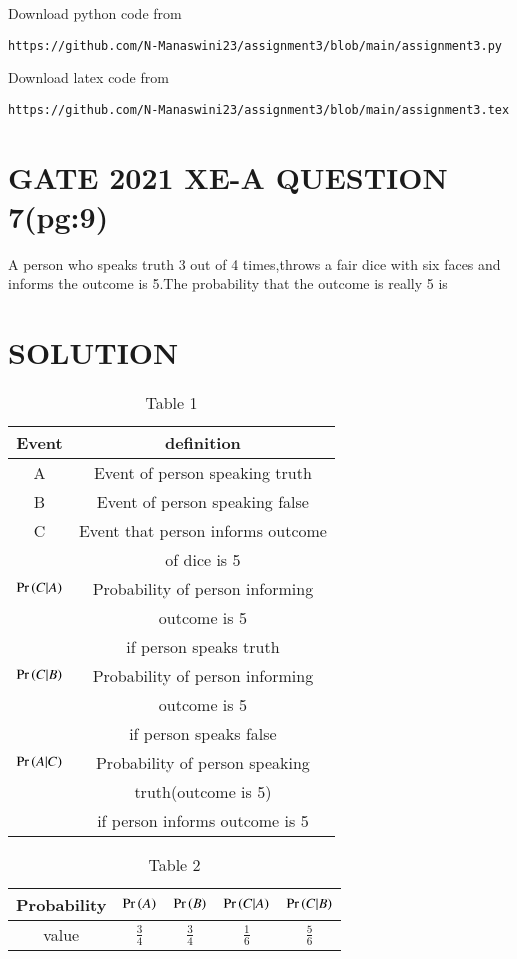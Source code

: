 \documentclass[journal,12pt,twocolumn]{IEEEtran}
\begin{document}
\renewcommand{\thefigure}{\theenumi}
\renewcommand{\thetable}{\theenumi}
Download python code from 
\begin{lstlisting}
https://github.com/N-Manaswini23/assignment3/blob/main/assignment3.py
\end{lstlisting}
%
Download latex code from 
\begin{lstlisting}
https://github.com/N-Manaswini23/assignment3/blob/main/assignment3.tex
\end{lstlisting}
%

\section*{GATE 2021 XE-A QUESTION 7(pg:9)}
A person who speaks truth 3 out of 4 times,throws a fair dice with six faces and informs the outcome is 5.The probability that the outcome is really 5 is \\ 
\section*{SOLUTION}
\begin{table}[h!]
\resizebox{9.43cm}{!}
{ 
\begin{tabular}{|c|c|}
\hline
Event & definition \\
\hline
A & Event of person speaking truth\\
\hline
B & Event of person speaking false\\
\hline
C  & Event that person informs outcome\\
& of dice is 5 \\
\hline
$\Pr\left(C|A\right)$ & Probability of person informing \\
& outcome is 5\\
& if person speaks truth\\
\hline
$\Pr\left(C|B\right)$ & Probability of person informing \\
&outcome is 5\\
& if person speaks false\\ 
\hline
$\Pr\left(A|C\right)$ & Probability of person speaking\\
& truth(outcome is 5) \\
& if person informs outcome is 5\\
\hline
\end{tabular}
}
\caption{Table 1} 
\label{tab:1}
\end{table}

\begin{table}[h!]
\resizebox{9.5cm}{!}
{ 
\begin{tabular}{|c|c|c|c|c|}
\hline
Probability & $\Pr\left(A\right)$ & $\Pr\left(B\right)$ & $\Pr\left(C|A\right)$ & $\Pr\left(C|B\right)$ \\
\hline
value & $\frac{3}{4}$ &  $\frac{3}{4}$ &  $\frac{1}{6}$ &  $\frac{5}{6}$ \\
\hline
\end{tabular}
}
\caption{Table 2} 
\label{tab:2}
\end{table}
\end{document}
